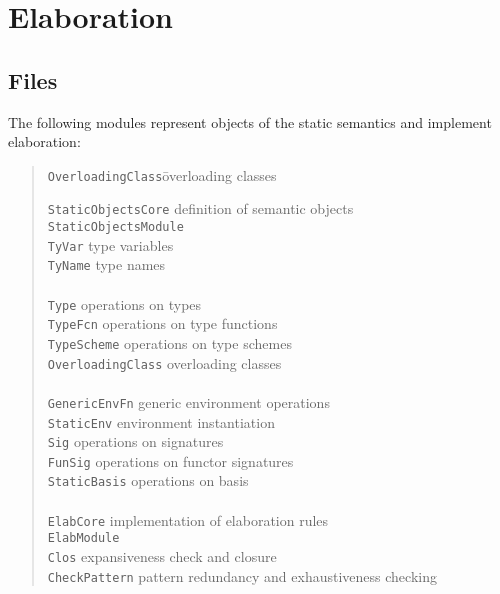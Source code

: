 \documentclass[twoside,titlepage]{article}
\begin{document}
\section{Elaboration}
\label{elaboration}

\subsection{Files}
\label{elaborationfiles}

The following modules represent objects of the static semantics and implement elaboration:

\begin{quote}
\begin{tabbing}
{\tt OverloadingClass}\qquad\= overloading classes
\kill

{\tt StaticObjectsCore}	\> definition of semantic objects \\
{\tt StaticObjectsModule} \> \\

{\tt TyVar}		\> type variables \\
{\tt TyName}		\> type names \\
\\
{\tt Type}		\> operations on types \\
{\tt TypeFcn}		\> operations on type functions \\
{\tt TypeScheme}	\> operations on type schemes \\
{\tt OverloadingClass}	\> overloading classes \\
\\
{\tt GenericEnvFn}	\> generic environment operations \\
{\tt StaticEnv}		\> environment instantiation \\
{\tt Sig}		\> operations on signatures \\
{\tt FunSig}		\> operations on functor signatures \\
{\tt StaticBasis}	\> operations on basis \\
\\
{\tt ElabCore}		\> implementation of elaboration rules \\
{\tt ElabModule}	\> \\
{\tt Clos}		\> expansiveness check and closure \\
{\tt CheckPattern}	\> pattern redundancy and exhaustiveness checking \\
\end{tabbing}
\end{quote}
\end{document}
